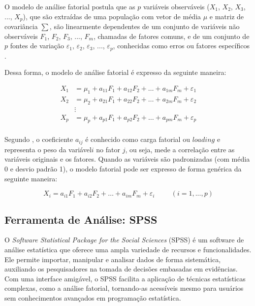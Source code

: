 O modelo de análise fatorial postula que as $p$ variáveis observáveis ($X_1$, $X_2$, $X_3$, ..., $X_p$), que são extraídas de uma população com vetor de média $\mu$ e matriz de covariância $\sum$, são linearmente dependentes de um conjunto de variáveis não observáveis $F_1$, $F_2$, $F_3$, ..., $F_m$, chamadas de fatores comuns, e de um conjunto de $p$ fontes de variação $\varepsilon_1$, $\varepsilon_2$, $\varepsilon_3$, ..., $\varepsilon_p$, conhecidas como erros ou fatores específicos . 

Dessa forma, o modelo de análise fatorial é expresso da seguinte maneira:

\begin{align}
X_1 &= \mu_1 + a_{11}F_1 + a_{12}F_2 + \ldots + a_{1m}F_m +\varepsilon_1  \nonumber \\
X_2 &= \mu_2 + a_{21}F_1 + a_{22}F_2 + \ldots + a_{2m}F_m +\varepsilon_2  \nonumber \\
&\vdots \nonumber \\
X_p &= \mu_p + a_{p1}F_1 + a_{p2}F_2 + \ldots + a_{pm}F_m +\varepsilon_p  \nonumber \\ \label{eq:4}
\end{align}

Segundo , o coeficiente $a_{ij}$ é conhecido como carga fatorial ou $loading$ e representa o peso da variável$i$ no fator $j$, ou seja, mede a correlação entre as variáveis originais e os fatores. Quando as variáveis são padronizadas (com média 0 e desvio padrão 1), o modelo fatorial pode ser expresso de forma genérica da seguinte maneira:

\begin{equation}
X_i =  a_{i1}F_1 + a_{i2}F_2 + \ldots + a_{im}F_m +\varepsilon_i \hspace{1cm}(i=1, ..., p)
\label{eq:5}
\end{equation}

\subsection{Ferramenta de Análise: SPSS}

O \textit{Software Statistical Package for the Social Sciences} (SPSS) é um software de análise estatística que oferece uma ampla variedade de recursos e funcionalidades. Ele permite importar, manipular e analisar dados de forma sistemática, auxiliando os pesquisadores na tomada de decisões embasadas em evidências. Com uma interface amigável, o SPSS facilita a aplicação de técnicas estatísticas complexas, como a análise fatorial, tornando-as acessíveis mesmo para usuários sem conhecimentos avançados em programação estatística.

